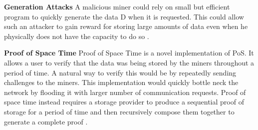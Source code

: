\textbf{Generation Attacks}
A malicious miner could rely on small but efficient program to quickly generate the data D when it is requested. This could allow such an attacker to gain reward for storing large amounts of data even when he physically does not have the capacity to do so \cite{paper:007}.

\textbf{Proof of Space Time}
Proof of Space Time is a novel implementation of PoS. It allows a user to verify that the data was being stored by the miners throughout a period of time. A natural way to verify this would be by repeatedly sending challenges to the miners. This implementation would quickly bottle neck the network by flooding it with larger number of communication requests. Proof of space time instead requires a storage provider to produce a sequential proof of storage for a period of time and then recursively compose them together to generate a complete proof \cite{paper:007}.





